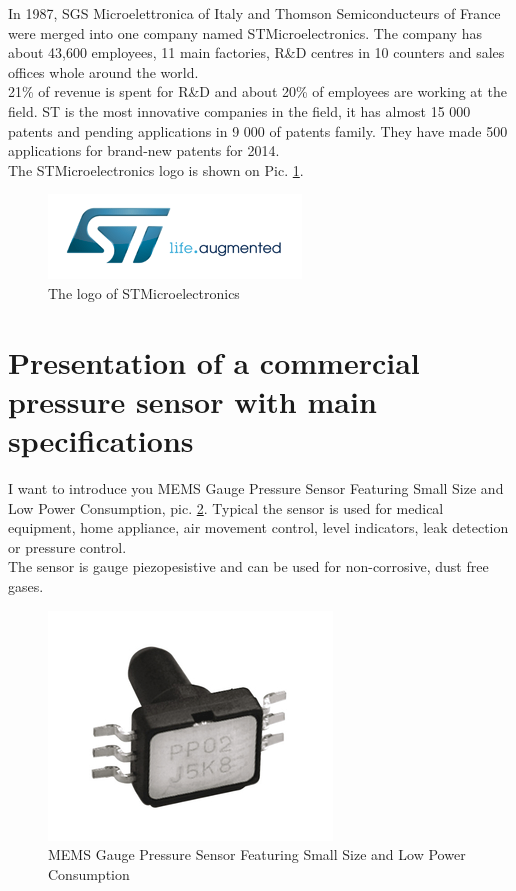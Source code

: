 \documentclass[english]{article}
\begin{document}
In 1987, SGS Microelettronica of Italy and Thomson Semiconducteurs of France were merged into one company named STMicroelectronics. The company has about 43,600 employees, 11 main factories, R\&D centres in 10 counters and sales offices whole around the world.\\

21\% of revenue is spent for R\&D and about 20\% of employees are working at the field. ST is the most innovative companies in the field, it has almost 15 000 patents and pending applications in 9 000 of patents family. They have made 500 applications for brand-new patents for 2014.\cite{st}\\

The STMicroelectronics logo is shown on Pic. \ref{fig:st}.

\begin{figure}[H]
\centerline{\includegraphics[scale=0.5]{PressureSensors/st}}
\caption{The logo of STMicroelectronics\label{fig:st}}
\end{figure}


\section{Presentation of a commercial pressure sensor with main specifications}

I want to introduce you MEMS Gauge Pressure Sensor Featuring Small Size and Low Power Consumption, pic. \ref{fig:sensor}. Typical the sensor is used for medical equipment, home appliance, air movement control, level indicators, leak detection or pressure control.\\

The sensor is gauge piezopesistive and can be used for non-corrosive, dust free gases.\\ 

\begin{figure}
\centerline{\includegraphics[scale=1]{PressureSensors/sensor}}
\caption{MEMS Gauge Pressure Sensor Featuring Small Size and Low Power Consumption\label{fig:sensor}}
\end{figure}
\end{document}

